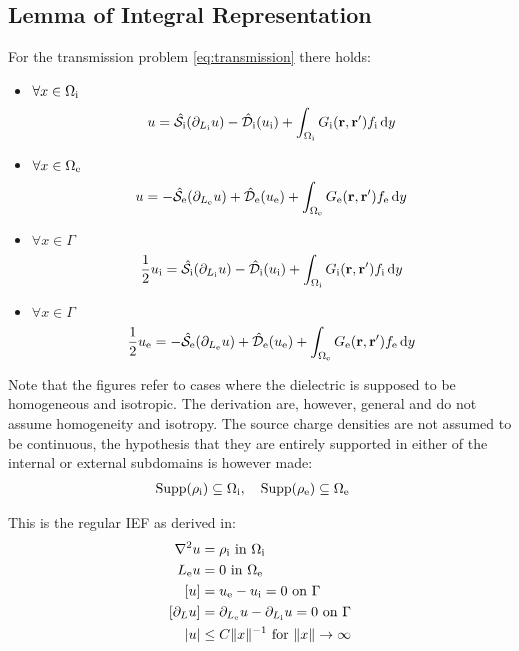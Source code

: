 \subsection{Lemma of Integral Representation}
For the transmission problem \ref{eq:transmission} there holds:
\begin{itemize}
\item $\forall x \in \Omega_\mathrm{i}$
\begin{equation}
u = \hat{\mathcal{S}}_\mathrm{i}(\partial_{L_\mathrm{i}} u)
- \hat{\mathcal{D}}_\mathrm{i}(u_\mathrm{i}) + \int_{\Omega_\mathrm{i}} G_\mathrm{i}(\mathbf{r}, \mathbf{r}^\prime) f_\mathrm{i}\mathop{}\!\mathrm{d} y
\end{equation}
\item $\forall x \in \Omega_\mathrm{e}$
\begin{equation}
u = -\hat{\mathcal{S}}_\mathrm{e}(\partial_{L_\mathrm{e}} u)
+ \hat{\mathcal{D}}_\mathrm{e}(u_\mathrm{e}) + \int_{\Omega_\mathrm{e}}G_\mathrm{e}(\mathbf{r}, \mathbf{r}^\prime) f_\mathrm{e}\mathop{}\!\mathrm{d} y
\end{equation}
\item $\forall x \in \Gamma$
  \begin{equation}\label{eq:stat3}
    \frac{1}{2}u_\mathrm{i} = \hat{\mathcal{S}}_\mathrm{i}(\partial_{L_\mathrm{i}} u)
    - \hat{\mathcal{D}}_\mathrm{i}(u_\mathrm{i}) + \int_{\Omega_\mathrm{i}}G_\mathrm{i}(\mathbf{r}, \mathbf{r}^\prime) f_\mathrm{i}\mathop{}\!\mathrm{d} y
  \end{equation}
\item $\forall x \in \Gamma$
  \begin{equation}\label{eq:stat4}
    \frac{1}{2}u_\mathrm{e} = -\hat{\mathcal{S}}_\mathrm{e}(\partial_{L_\mathrm{e}} u)
    + \hat{\mathcal{D}}_\mathrm{e}(u_\mathrm{e}) + \int_{\Omega_\mathrm{e}}G_\mathrm{e}(\mathbf{r}, \mathbf{r}^\prime) f_\mathrm{e}\mathop{}\!\mathrm{d} y
  \end{equation}
\end{itemize}

Note that the figures refer to cases where the dielectric is supposed to
be homogeneous and isotropic. The derivation are, however, general and
do not assume homogeneity and isotropy.
The source charge densities are not assumed to be continuous, the
hypothesis that they are entirely supported in either of the internal or
external subdomains is however made:
\begin{alignat}{2}
  \mathop{}\!\mathrm{Supp}(\rho_\mathrm{i}) \subseteq \Omega_\mathrm{i}, \quad& \mathop{}\!\mathrm{Supp}(\rho_\mathrm{e}) \subseteq \Omega_\mathrm{e}
\end{alignat}

This is the regular \acs{IEF} as derived in:~\autocite{Cances1998-og}
\begin{subequations}
\begin{align}
  \nabla^2 u &= \rho_\mathrm{i} \,\, \text{in}\,\, \Omega_\mathrm{i} \\
  L_\mathrm{e} u &= 0 \,\, \text{in}\,\, \Omega_\mathrm{e} \\
  [u] &= u_\mathrm{e} - u_\mathrm{i} = 0 \,\, \text{on}\,\, \Gamma \\
[\partial_L u] &= \partial_{L_\mathrm{e}} u - \partial_{L_\mathrm{i}} u = 0 \,\,
\text{on}\,\, \Gamma \\
|u| &\leq C \|x \|^{-1} \,\,\text{for}\,\,\| x \|\rightarrow\infty
\end{align}
\end{subequations}


